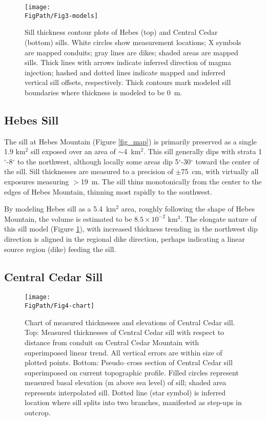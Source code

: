 \begin{figure}
\centering
\texttt{[image: \\FigPath/Fig3-models]}
\caption[Sill thickness contour plots of Hebes and Central Cedar sills]{Sill thickness contour plots of Hebes (top) and Central Cedar (bottom) sills. White circles show measurement locations; X symbols are mapped conduits; gray lines are dikes; shaded areas are mapped sills. Thick lines with arrows indicate inferred direction of magma injection; hashed and dotted lines indicate mapped and inferred vertical sill offsets, respectively. Thick contours mark modeled sill boundaries where thickness is modeled to be 0~m.}
\label{fig_twomodels}
\end{figure}

\subsection{Hebes Sill}

The sill at Hebes Mountain (Figure \ref{fig_map}) is primarily preserved as a single 1.9 km$^2$ sill exposed over an area of $\sim$4~km$^2$. This sill generally dips with strata 1$^{\circ}$-8$^{\circ}$ to the northwest, although locally some areas dip 5$^{\circ}$-30$^{\circ}$ toward the center of the sill. Sill thicknesses are measured to a precision of $\pm$75~cm, with virtually all exposures measuring $>$19~m. The sill thins monotonically from the center to the edges of Hebes Mountain, thinning most rapidly to the southwest.

By modeling Hebes sill as a 5.4~km$^2$ area, roughly following the shape of Hebes Mountain, the volume is estimated to be $8.5\times 10^{-2}$ km$^3$. The elongate nature of this sill model (Figure \ref{fig_twomodels}), with increased thickness trending in the northwest dip direction is aligned in the regional dike direction, perhaps indicating a linear source region (dike) feeding the sill.

\subsection{Central Cedar Sill}

\begin{figure}
\centering
\texttt{[image: \\FigPath/Fig4-chart]}
\caption[Chart of measured thicknesses and elevations of Central Cedar sill]{Chart of measured thicknesses and elevations of Central Cedar sill. Top: Measured thicknesses of Central Cedar sill with respect to distance from conduit on Central Cedar Mountain with superimposed linear trend. All vertical errors are within size of plotted points. Bottom: Pseudo–cross section of Central Cedar sill superimposed on current topographic profile. Filled circles represent measured basal elevation (m above sea level) of sill; shaded area represents interpolated sill. Dotted line (star symbol) is inferred location where sill splits into two branches, manifested as step-ups in outcrop.}
\label{fig_chart}
\end{figure}

